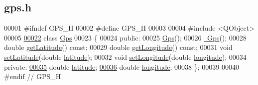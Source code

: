 \hypertarget{gps_8h_source}{}\subsection{gps.\+h}
\label{gps_8h_source}

\begin{DoxyCode}
00001 \textcolor{preprocessor}{#ifndef GPS\_H}
00002 \textcolor{preprocessor}{#define GPS\_H}
00003 
00004 \textcolor{preprocessor}{#include <QObject>}
00005 
\hypertarget{gps_8h_source.tex_l00022}{}\hyperlink{class_gps}{00022} \textcolor{keyword}{class }\hyperlink{class_gps}{Gps}
00023 \{
00024 \textcolor{keyword}{public}:
00025     \hyperlink{class_gps_a10a73359b33c1357564ebc83fc078000}{Gps}();      
00026     \hyperlink{class_gps_a9f076d88f081ae5c010cf150cb957b66}{~Gps}();     
00028     \textcolor{keywordtype}{double} \hyperlink{class_gps_a44c6469bf67727853c06d4be037c6b0f}{getLatitude}() \textcolor{keyword}{const};     
00029     \textcolor{keywordtype}{double} \hyperlink{class_gps_a6ce8da770e213bfbf7f204b107d9e3f5}{getLongitude}() \textcolor{keyword}{const};    
00031     \textcolor{keywordtype}{void} \hyperlink{class_gps_aaabf328f0bbcdbb9c2901e30b6edccc7}{setLatitude}(\textcolor{keywordtype}{double} \hyperlink{class_gps_a2457bce0fe69afbf68c27a4807c3f847}{latitude});      
00032     \textcolor{keywordtype}{void} \hyperlink{class_gps_a2d9ca07c62c5bae627c2131062a1236a}{setLongitude}(\textcolor{keywordtype}{double} \hyperlink{class_gps_a6e56fa2b9f1402901a0c768b796402ce}{longitude});    
00034 \textcolor{keyword}{private}:
\hypertarget{gps_8h_source.tex_l00035}{}\hyperlink{class_gps_a2457bce0fe69afbf68c27a4807c3f847}{00035}     \textcolor{keywordtype}{double} \hyperlink{class_gps_a2457bce0fe69afbf68c27a4807c3f847}{latitude};        
\hypertarget{gps_8h_source.tex_l00036}{}\hyperlink{class_gps_a6e56fa2b9f1402901a0c768b796402ce}{00036}     \textcolor{keywordtype}{double} \hyperlink{class_gps_a6e56fa2b9f1402901a0c768b796402ce}{longitude};       
00038 \};
00039 
00040 \textcolor{preprocessor}{#endif // GPS\_H}
\end{DoxyCode}
